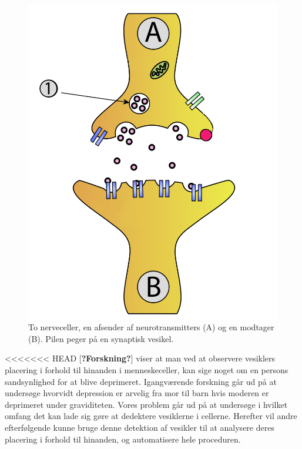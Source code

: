 \begin{figure}[H]
	\centering
	\includegraphics[scale=0.2]{files/intro/img/synTransmitter.png}
	\caption{To nerveceller, en afsender af neurotransmitters (A) og en modtager (B). Pilen peger på en synaptisk vesikel.\label{fig:intro_syntrans}}
\end{figure} 

<<<<<<< HEAD
[\textbf{?Forskning?}] viser at man ved at observere vesiklers placering i forhold til hinanden i menneskeceller, kan sige noget om en persons sandsynlighed for at blive deprimeret.
Igangværende forskning går ud på at undersøge hvorvidt depression er arvelig fra mor til barn hvis moderen er deprimeret under graviditeten.
Vores problem går ud på at undersøge i hvilket omfang det kan lade sig gøre at dedektere vesiklerne i cellerne.
Herefter vil andre efterfølgende kunne bruge denne detektion af vesikler til at analysere deres placering i forhold til hinanden, og automatisere hele proceduren.


